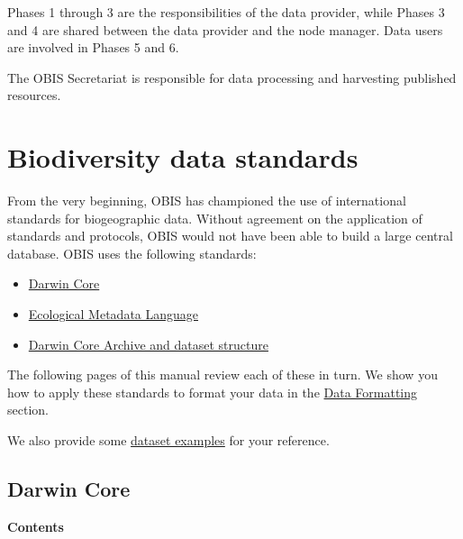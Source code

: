 \documentclass[
  letterpaper,
  DIV=11,
  numbers=noendperiod,
  oneside]{scrreprt}
\providecommand{\tightlist}{%
  \setlength{\itemsep}{0pt}\setlength{\parskip}{0pt}}\usepackage{longtable,booktabs,array}
\begin{document}
Phases 1 through 3 are the responsibilities of the data provider, while
Phases 3 and 4 are shared between the data provider and the node
manager. Data users are involved in Phases 5 and 6.

The OBIS Secretariat is responsible for data processing and harvesting
published resources.

\hypertarget{biodiversity-data-standards}{%
\section{Biodiversity data
standards}\label{biodiversity-data-standards}}

From the very beginning, OBIS has championed the use of international
standards for biogeographic data. Without agreement on the application
of standards and protocols, OBIS would not have been able to build a
large central database. OBIS uses the following standards:

\begin{itemize}
\tightlist
\item
  \href{darwin_core.html}{Darwin Core}
\item
  \href{eml.html}{Ecological Metadata Language}
\item
  \href{data_format.html}{Darwin Core Archive and dataset structure}
\end{itemize}

The following pages of this manual review each of these in turn. We show
you how to apply these standards to format your data in the
\href{formatting.html}{Data Formatting} section.

We also provide some \href{examples.html}{dataset examples} for your
reference.

\hypertarget{darwin-core}{%
\subsection{Darwin Core}\label{darwin-core}}

\textbf{Contents}
\end{document}

